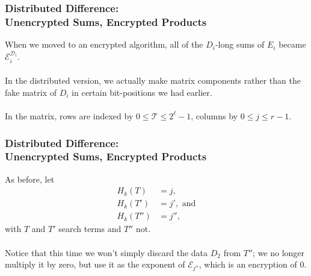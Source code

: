 \documentclass{beamer}
\makeatletter
\DeclareRobustCommand*{\&}{%
  \nfss@text{%
    \fontfamily{LinuxBiolinumT-TLF}%
    \selectfont
    \symbol{`\&}%
  }%
}
\makeatother
\begin{document}
\begin{frame}
  \frametitle{Distributed Difference:\\ Unencrypted Sums, Encrypted Products}
  When we moved to an encrypted algorithm, all of the $D_i$-long sums of
  $E_i$ became
  $\mathcal{E}_i^{\mathcal{D}_i}$.\\~\\
  In the distributed version, we actually make matrix components rather than
  the fake matrix of $D_i$ in certain bit-positions we had earlier.\\~\\
  
  In the matrix, rows are indexed by $0 \leq \mathcal{T} \leq 2^\ell
  -1$, columns by $0 \leq j \leq r-1$.
\end{frame}


\begin{frame}
  \frametitle{Distributed Difference:\\ Unencrypted Sums, Encrypted Products}
  As before, let 
  \begin{align*}
    H_k(T) &= j,\\
    H_k(T') &= j',\text{ and}\\
    H_k(T'') &= j'',
  \end{align*}
  with $T$ and $T'$ search terms and $T''$ not.\\~\\
  Notice that this time we won't simply discard the data $D_2$ from $T''$;
  we no longer multiply it by zero, but use it as the exponent of
  $\mathcal{E}_{j''}$, which is an encryption of $0$.
\end{frame}
\end{document}

